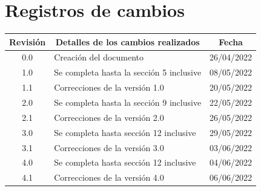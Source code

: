 \documentclass[
11pt, %
]{charter}
\begin{document}
\maketitle
\thispagestyle{empty}
\pagebreak


\thispagestyle{empty}
{\setlength{\parskip}{0pt}
\tableofcontents{}
}
\pagebreak


\section*{Registros de cambios}
\label{sec:registro}


\begin{table}[ht]
\label{tab:registro}
\centering
\begin{tabularx}{\linewidth}{@{}|c|X|c|@{}}
\hline
\rowcolor[HTML]{C0C0C0} 
Revisión & \multicolumn{1}{c|}{\cellcolor[HTML]{C0C0C0}Detalles de los cambios realizados} & Fecha      \\ \hline
0.0      & Creación del documento                                 			& 26/04/2022 \\ \hline
1.0      & Se completa hasta la sección 5 inclusive               	& 08/05/2022 \\ \hline

1.1      & Correcciones de la versión 1.0                 					& 20/05/2022 \\ \hline
2.0      & Se completa hasta la sección 9 inclusive					& 22/05/2022 \\ \hline
2.1      & Correcciones de la versión 2.0					& 26/05/2022 \\ \hline
3.0      & Se completa hasta sección 12 inclusive					& 29/05/2022 \\ \hline
3.1      & Correcciones de la versión 3.0					& 03/06/2022 \\ \hline
4.0      & Se completa hasta sección 12 inclusive					& 04/06/2022 \\ \hline
4.1      & Correcciones de la versión 4.0					& 06/06/2022 \\ \hline
\end{tabularx}
\end{table}
\end{document}
